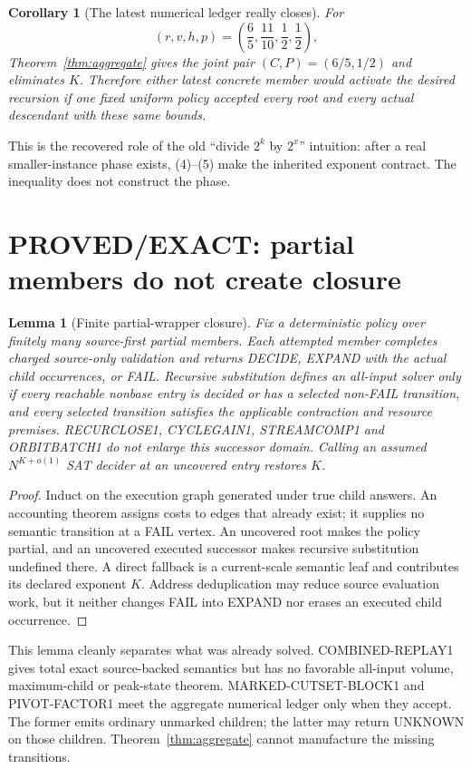 \documentclass[11pt]{article}
\newtheorem{lemma}[theorem]{Lemma}
\newtheorem{corollary}[theorem]{Corollary}
\begin{document}
\begin{corollary}[The latest numerical ledger really closes]
For
\[
 (r,v,h,p)=\left(\frac65,\frac{11}{10},\frac12,\frac12\right),
\]
Theorem~\ref{thm:aggregate} gives the joint pair
$(C,P)=(6/5,1/2)$ and eliminates $K$.  Therefore either latest concrete
member would activate the desired recursion if one fixed uniform policy
accepted every root and every actual descendant with these same bounds.
\end{corollary}

This is the recovered role of the old ``divide $2^k$ by $2^x$'' intuition:
after a real smaller-instance phase exists, (4)--(5) make the inherited
exponent contract.  The inequality does not construct the phase.

\section{PROVED/EXACT: partial members do not create closure}

\begin{lemma}[Finite partial-wrapper closure]\label{lem:portfolio}
Fix a deterministic policy over finitely many source-first partial members.
Each attempted member completes charged source-only validation and returns
DECIDE, EXPAND with the actual child occurrences, or FAIL.  Recursive
substitution defines an all-input solver only if every reachable nonbase entry
is decided or has a selected non-FAIL transition, and every selected
transition satisfies the applicable contraction and resource premises.
RECURCLOSE1, CYCLEGAIN1, STREAMCOMP1 and ORBITBATCH1 do not enlarge this
successor domain.  Calling an assumed $N^{K+o(1)}$ SAT decider at an uncovered
entry restores $K$.
\end{lemma}
\begin{proof}
Induct on the execution graph generated under true child answers.  An
accounting theorem assigns costs to edges that already exist; it supplies no
semantic transition at a FAIL vertex.  An uncovered root makes the policy
partial, and an uncovered executed successor makes recursive substitution
undefined there.  A direct fallback is a current-scale semantic leaf and
contributes its declared exponent $K$.  Address deduplication may reduce
source evaluation work, but it neither changes FAIL into EXPAND nor erases an
executed child occurrence.
\end{proof}

This lemma cleanly separates what was already solved.  COMBINED-REPLAY1 gives
total exact source-backed semantics but has no favorable all-input volume,
maximum-child or peak-state theorem.  MARKED-CUTSET-BLOCK1 and
PIVOT-FACTOR1 meet the aggregate numerical ledger only when they accept.
The former emits ordinary unmarked children; the latter may return UNKNOWN
on those children.  Theorem~\ref{thm:aggregate} cannot manufacture the
missing transitions.
\end{document}

